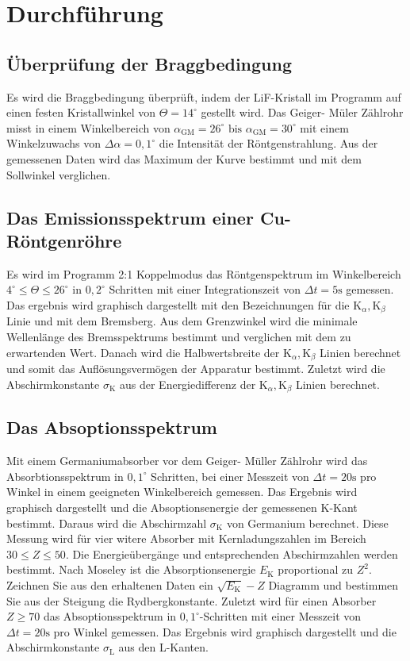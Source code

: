 \section{Durchführung}
\label{sec:Durchführung}
\subsection{Überprüfung der Braggbedingung}
Es wird die Braggbedingung überprüft, indem der LiF-Kristall im Programm auf einen festen Kristallwinkel von $\Theta = 14^\circ$ gestellt wird.
Das Geiger- Müler Zählrohr misst in einem Winkelbereich von ${\alpha}_{\text{GM}} = 26^\circ \text{ bis } {\alpha}_{\text{GM}} = 30^\circ$ mit einem Winkelzuwachs von $\Delta \alpha = 0,1^\circ$ die Intensität der Röntgenstrahlung.
Aus der gemessenen Daten wird das Maximum der Kurve bestimmt und mit dem Sollwinkel verglichen.

\subsection{Das Emissionsspektrum einer Cu-Röntgenröhre}
Es wird im Programm 2:1 Koppelmodus das Röntgenspektrum im Winkelbereich $4^\circ \leq \Theta \leq 26^\circ$ in $0,2^\circ$ Schritten mit einer Integrationszeit von $\Delta t = 5 \text{s}$ gemessen.
Das ergebnis wird graphisch dargestellt mit den Bezeichnungen für die $\text{K}_{\alpha},\text{K}_{\beta}$ Linie und mit dem Bremsberg.
Aus dem Grenzwinkel wird die minimale Wellenlänge des Bremsspektrums bestimmt und verglichen mit dem zu erwartenden Wert.
Danach wird die Halbwertsbreite der $\text{K}_{\alpha},\text{K}_{\beta}$ Linien berechnet und somit das Auflösungsvermögen der Apparatur bestimmt.
Zuletzt wird die Abschirmkonstante ${\sigma}_\text{K}$ aus der Energiedifferenz der $\text{K}_{\alpha},\text{K}_{\beta}$ Linien berechnet.

\subsection{Das Absoptionsspektrum}
Mit einem Germaniumabsorber vor dem Geiger- Müller Zählrohr wird das Absorbtionsspektrum in $0,1^\circ$ Schritten, bei einer Messzeit von $\Delta t = 20 \text{s}$ pro Winkel in einem geeigneten Winkelbereich gemessen.
Das Ergebnis wird graphisch dargestellt und die Absoptionsenergie der gemessenen K-Kant bestimmt.
Daraus wird die Abschirmzahl ${\sigma}_{\text{K}}$ von Germanium berechnet.
Diese Messung wird für vier witere Absorber mit Kernladungszahlen im Bereich $30 \leq Z \leq 50$.
Die Energieübergänge und entsprechenden Abschirmzahlen werden bestimmt.
Nach Moseley ist die Absorptionsenergie $E_{\text{K}}$ proportional zu $Z^2$.
Zeichnen Sie aus den erhaltenen Daten ein $\sqrt{E_{\text{K}}} - Z$ Diagramm und bestimmen Sie aus der Steigung die Rydbergkonstante.
Zuletzt wird für einen Absorber $Z \geq 70 $ das Absoptionsspektrum in $0,1^\circ$-Schritten mit einer Messzeit von $\Delta t = 20 \text{s}$ pro Winkel gemessen.
Das Ergebnis wird graphisch dargestellt und die Abschirmkonstante ${\sigma}_{\text{L}}$ aus den L-Kanten.